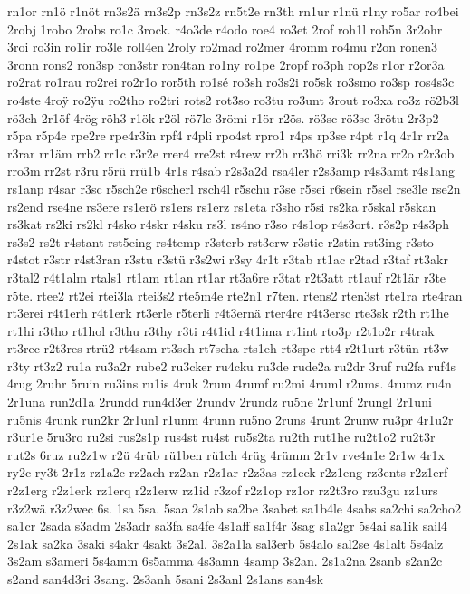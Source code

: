 {rn1or
rn1ö
r1nöt
rn3s2ä
rn3s2p
rn3s2z
rn5t2e
rn3th
rn1ur
r1nü
r1ny
ro5ar
ro4bei
2robj
1robo
2robs
ro1c
3rock.
r4o3de
r4odo
roe4
ro3et
2rof
roh1l
roh5n
3r2ohr
3roi
ro3in
ro1ir
ro3le
roll4en
2roly
ro2mad
ro2mer
4romm
ro4mu
r2on
ronen3
3ronn
rons2
ron3sp
ron3str
ron4tan
ro1ny
ro1pe
2ropf
ro3ph
rop2s
r1or
r2or3a
ro2rat
ro1rau
ro2rei
ro2r1o
ror5th
ro1sé
ro3sh
ro3s2i
ro5sk
ro3smo
ro3sp
ros4s3c
ro4ste
4ro^^ff
ro2^^ffu
ro2tho
ro2tri
rots2
rot3so
ro3tu
ro3unt
3rout
ro3xa
ro3z
rö2b3l
rö3ch
2r1öf
4rög
röh3
r1ök
r2öl
rö7le
3römi
r1ör
r2ös.
rö3sc
rö3se
3rötu
2r3p2
r5pa
r5p4e
rpe2re
rpe4r3in
rpf4
r4pli
rpo4st
rpro1
r4ps
rp3se
r4pt
r1q
4r1r
rr2a
r3rar
rr1äm
rrb2
rr1c
r3r2e
rrer4
rre2st
r4rew
rr2h
rr3hö
rri3k
rr2na
rr2o
r2r3ob
rro3m
rr2st
r3ru
r5rü
rrü1b
4r1s
r4sab
r2s3a2d
rsa4ler
r2s3amp
r4s3amt
r4s1ang
rs1anp
r4sar
r3sc
r5sch2e
r6scherl
rsch4l
r5schu
r3se
r5sei
r6sein
r5sel
rse3le
rse2n
rs2end
rse4ne
rs3ere
rs1erö
rs1ers
rs1erz
rs1eta
r3sho
r5si
rs2ka
r5skal
r5skan
rs3kat
rs2ki
rs2kl
r4sko
r4skr
r4sku
rs3l
rs4no
r3so
r4s1op
r4s3ort.
r3s2p
r4s3ph
rs3s2
rs2t
r4stant
rst5eing
rs4temp
r3sterb
rst3erw
r3stie
r2stin
rst3ing
r3sto
r4stot
r3str
r4st3ran
r3stu
r3stü
r3s2wi
r3sy
4r1t
r3tab
rt1ac
r2tad
r3taf
rt3akr
r3tal2
r4t1alm
rtals1
rt1am
rt1an
rt1ar
rt3a6re
r3tat
r2t3att
rt1auf
r2t1är
r3te
r5te.
rtee2
rt2ei
rtei3la
rtei3s2
rte5m4e
rte2n1
r7ten.
rtens2
rten3st
rte1ra
rte4ran
rt3erei
r4t1erh
r4t1erk
rt3erle
r5terli
r4t3ernä
rter4re
r4t3ersc
rte3sk
r2th
rt1he
rt1hi
r3tho
rt1hol
r3thu
r3thy
r3ti
r4t1id
r4t1ima
rt1int
rto3p
r2t1o2r
r4trak
rt3rec
r2t3res
rtrü2
rt4sam
rt3sch
rt7scha
rts1eh
rt3spe
rtt4
r2t1urt
r3tün
rt3w
r3ty
rt3z2
ru1a
ru3a2r
rube2
ru3cker
ru4cku
ru3de
rude2a
ru2dr
3ruf
ru2fa
ruf4s
4rug
2ruhr
5ruin
ru3ins
ru1is
4ruk
2rum
4rumf
ru2mi
4ruml
r2ums.
4rumz
ru4n
2r1una
run2d1a
2rundd
run4d3er
2rundv
2rundz
ru5ne
2r1unf
2rungl
2r1uni
ru5nis
4runk
run2kr
2r1unl
r1unm
4runn
ru5no
2runs
4runt
2runw
ru3pr
4r1u2r
r3ur1e
5ru3ro
ru2si
rus2s1p
rus4st
ru4st
ru5s2ta
ru2th
rut1he
ru2t1o2
ru2t3r
rut2s
6ruz
ru2z1w
r2ü
4rüb
rü1ben
rü1ch
4rüg
4rümm
2r1v
rve4n1e
2r1w
4r1x
ry2c
ry3t
2r1z
rz1a2c
rz2ach
rz2an
r2z1ar
r2z3as
rz1eck
r2z1eng
rz3ents
r2z1erf
r2z1erg
r2z1erk
rz1erq
r2z1erw
rz1id
r3zof
r2z1op
rz1or
rz2t3ro
rzu3gu
rz1urs
r3z2wä
r3z2wec
6s.
1sa
5sa.
5saa
2s1ab
sa2be
3sabet
sa1b4le
4sabs
sa2chi
sa2cho2
sa1cr
2sada
s3adm
2s3adr
sa3fa
sa4fe
4s1aff
sa1f4r
3sag
s1a2gr
5s4ai
sa1ik
sail4
2s1ak
sa2ka
3saki
s4akr
4sakt
3s2al.
3s2a1la
sal3erb
5s4alo
sal2se
4s1alt
5s4alz
3s2am
s3ameri
5s4amm
6s5amma
4s3amn
4samp
3s2an.
2s1a2na
2sanb
s2an2c
s2and
san4d3ri
3sang.
2s3anh
5sani
2s3anl
2s1ans
san4sk
}
